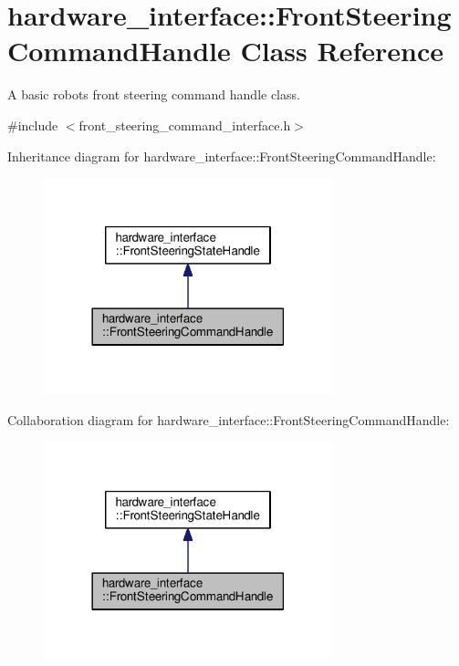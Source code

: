 \hypertarget{classhardware__interface_1_1FrontSteeringCommandHandle}{}\section{hardware\+\_\+interface\+:\+:Front\+Steering\+Command\+Handle Class Reference}
\label{classhardware__interface_1_1FrontSteeringCommandHandle}


A basic robot\textquotesingle{}s front steering command handle class.  




{\ttfamily \#include $<$front\+\_\+steering\+\_\+command\+\_\+interface.\+h$>$}



Inheritance diagram for hardware\+\_\+interface\+:\+:Front\+Steering\+Command\+Handle\+:\nopagebreak
\begin{figure}[H]
\begin{center}
\leavevmode
\includegraphics[width=237pt]{classhardware__interface_1_1FrontSteeringCommandHandle__inherit__graph}
\end{center}
\end{figure}


Collaboration diagram for hardware\+\_\+interface\+:\+:Front\+Steering\+Command\+Handle\+:\nopagebreak
\begin{figure}[H]
\begin{center}
\leavevmode
\includegraphics[width=237pt]{classhardware__interface_1_1FrontSteeringCommandHandle__coll__graph}
\end{center}
\end{figure}
